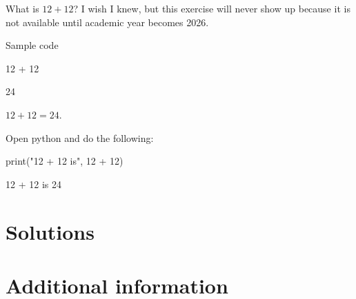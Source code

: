 \documentclass{book}
\begin{document}
\begin{exercise}[examdate={January 16, 2026}, examproblemnumber={1}, examproblemid={2026-01-16-01}]
  What is \(12 + 12\)? I wish I knew, but this exercise will never show up because it is not available until academic year becomes 2026.

Sample code
\begin{pycell}
12 + 12
\end{pycell}
\begin{pyexpectedoutput}
24
\end{pyexpectedoutput}
\end{exercise}

\begin{solution}
  \(12 + 12 = 24\).
\end{solution}

\begin{additionalinformation}
Open python and do the following:

\begin{pycell}
print("12 + 12 is", 12 + 12)
\end{pycell}
\begin{pyexpectedoutput}
12 + 12 is 24
\end{pyexpectedoutput}
\end{additionalinformation}

\chapter{Solutions}

\chapter{Additional information}

\SaveReplacements
\end{document}
